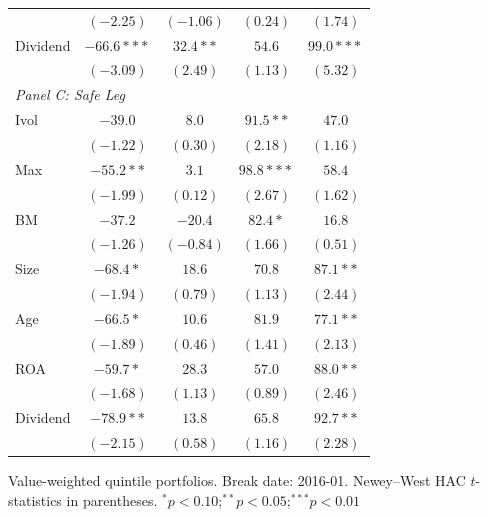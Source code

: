\begin{tabular}{l c c c c}
 & $(-2.25)$ & $(-1.06)$ & $(0.24)$ & $(1.74)$ \\
Dividend & $-66.6***$ & $32.4**$ & $54.6$ & $99.0***$ \\
 & $(-3.09)$ & $(2.49)$ & $(1.13)$ & $(5.32)$ \\
\midrule
\multicolumn{5}{l}{\textit{Panel C: Safe Leg}} \\
Ivol & $-39.0$ & $8.0$ & $91.5**$ & $47.0$ \\
 & $(-1.22)$ & $(0.30)$ & $(2.18)$ & $(1.16)$ \\
Max & $-55.2**$ & $3.1$ & $98.8***$ & $58.4$ \\
 & $(-1.99)$ & $(0.12)$ & $(2.67)$ & $(1.62)$ \\
BM & $-37.2$ & $-20.4$ & $82.4*$ & $16.8$ \\
 & $(-1.26)$ & $(-0.84)$ & $(1.66)$ & $(0.51)$ \\
Size & $-68.4*$ & $18.6$ & $70.8$ & $87.1**$ \\
 & $(-1.94)$ & $(0.79)$ & $(1.13)$ & $(2.44)$ \\
Age & $-66.5*$ & $10.6$ & $81.9$ & $77.1**$ \\
 & $(-1.89)$ & $(0.46)$ & $(1.41)$ & $(2.13)$ \\
ROA & $-59.7*$ & $28.3$ & $57.0$ & $88.0**$ \\
 & $(-1.68)$ & $(1.13)$ & $(0.89)$ & $(2.46)$ \\
Dividend & $-78.9**$ & $13.8$ & $65.8$ & $92.7**$ \\
 & $(-2.15)$ & $(0.58)$ & $(1.16)$ & $(2.28)$ \\
\bottomrule
\end{tabular}
\vspace{4pt}
\begin{minipage}{0.9\textwidth}
\footnotesize
Value-weighted quintile portfolios. Break date: 2016-01.
Newey--West HAC $t$-statistics in parentheses.
$^{*}p<0.10$;\quad $^{**}p<0.05$;\quad $^{***}p<0.01$
\end{minipage}
